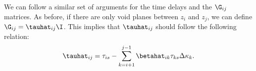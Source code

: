 We can follow a similar set of arguments for the time delays and the $\G_{i j}$ matrices. As before, if there are only void planes between $z_i$ and $z_j$, we can define $\G_{i j} = \tauhat_{i j} \I$. This implies that $\tauhat_{i j}$ should follow the following relation:
\begin{equation}
\tauhat_{i j} = \tau_{i s} - \sum\limits_{k = i + 1}^{j - 1}\betahat_{i k} \tau_{k s} \Delta \kappa_k.
\end{equation}
  
  